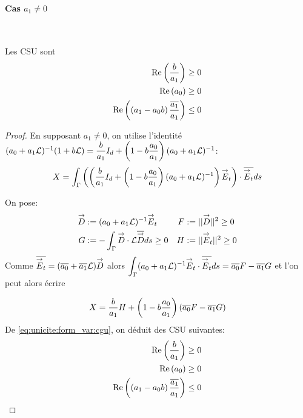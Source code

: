       \paragraph{Cas \(a_1\not=0\)}
        ~
        \begin{prop}
          Les CSU sont
          \begin{align}
            \operatorname{Re}\left(\dfrac{b}{a_1}\right) \ge 0 \\
            \operatorname{Re}\left(a_0\right) \ge 0 \\
            \operatorname{Re}\left(\left(a_1-a_0 b\right)\dfrac{{\overline{a_1}}}{a_1}\right) \le 0
          \end{align}
        \end{prop}
        \begin{proof}
          En supposant \(a_1 \not=0\), on utilise l'identité \((a_0 + a_1 \mathcal{L})^{-1}(1 + b \mathcal{L})  = \dfrac{b}{a_1} I_d + \left(1-b\dfrac{a_0}{a_1}\right)(a_0+a_1 \mathcal{L})^{-1}\):
          \[
            X = \int_\Gamma \left(\left(\dfrac{b}{a_1} I_d + \left(1-b\dfrac{a_0}{a_1}\right)(a_0+a_1 \mathcal{L})^{-1}\right){\overset{\rightarrow}{E}}_t\right) \cdot {\overline{{\overset{\rightarrow}{E}}_t}} ds
          \]

          On pose:
          \begin{align*}
            {\overset{\rightarrow}{D}} &:= (a_0 + a_1 \mathcal{L})^{-1}{\overset{\rightarrow}{E}}_t & F&:= || {\overset{\rightarrow}{D}} || ^2 \ge 0  
            \\
            G&:= -\int_\Gamma {\overset{\rightarrow}{D}} \cdot \mathcal{L}{\overline{{\overset{\rightarrow}{D}}}} ds \ge 0 & H &:= || {\overset{\rightarrow}{E}}_t || ^2 \ge 0
          \end{align*}
          Comme \({\overline{{\overset{\rightarrow}{E}}_t}} = ({\overline{a_0}} + {\overline{a_1}}\mathcal{L}){\overset{\rightarrow}{D}}\) alors \(\displaystyle\int_\Gamma (a_0 +a_1 \mathcal{L}) ^{-1}{\overset{\rightarrow}{E}}_t\cdot {\overline{{\overset{\rightarrow}{E}}_t}} ds = {\overline{a_0}} F - {\overline{a_1}} G\) et l'on peut alors écrire

          \begin{equation}
            \label{eq:unicite:form_var:decomp_cgu_ci1_a1}
            X = \dfrac{b}{a_1}H   + \left(1-b\dfrac{a_0}{a_1}\right)\left({\overline{a_0}} F - {\overline{a_1}} G\right)
          \end{equation}
          De \eqref{eq:unicite:form_var:cgu}, on déduit des CSU suivantes:
          \begin{align}
            \operatorname{Re}\left(\dfrac{b}{a_1}\right) \ge 0 \\
            \operatorname{Re}\left(a_0\right) \ge 0 \\
            \operatorname{Re}\left(\left(a_1-a_0 b\right)\dfrac{{\overline{a_1}}}{a_1}\right) \le 0
          \end{align}
        \end{proof}

